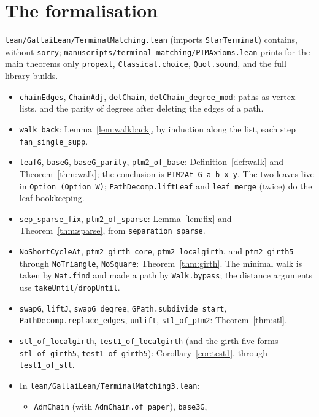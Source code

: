 \documentclass[11pt]{amsart}
\theoremstyle{definition}
\begin{document}
\section{The formalisation}\label{sec:lean}

\texttt{lean/GallaiLean/TerminalMatching.lean} (imports \texttt{StarTerminal}) contains, without
\texttt{sorry}; \texttt{manuscripts/terminal-matching/PTMAxioms.lean} prints for the main
theorems only \texttt{propext}, \texttt{Classical.choice}, \texttt{Quot.sound}, and the full
library builds.
\begin{itemize}
\item \texttt{chainEdges}, \texttt{ChainAdj}, \texttt{delChain}, \texttt{delChain\_degree\_mod}:
paths as vertex lists, and the parity of degrees after deleting the edges of a path.
\item \texttt{walk\_back}: Lemma~\ref{lem:walkback}, by induction along the list, each step
\texttt{fan\_single\_supp}.
\item \texttt{leafG}, \texttt{baseG}, \texttt{baseG\_parity}, \texttt{ptm2\_of\_base}:
Definition~\ref{def:walk} and Theorem~\ref{thm:walk}; the conclusion is \texttt{PTM2At G a b x y}.
The two leaves live in \texttt{Option (Option W)}; \texttt{PathDecomp.liftLeaf} and
\texttt{leaf\_merge} (twice) do the leaf bookkeeping.
\item \texttt{sep\_sparse\_fix}, \texttt{ptm2\_of\_sparse}: Lemma~\ref{lem:fix} and
Theorem~\ref{thm:sparse}, from \texttt{separation\_sparse}.
\item \texttt{NoShortCycleAt}, \texttt{ptm2\_girth\_core}, \texttt{ptm2\_localgirth}, and
\texttt{ptm2\_girth5} through \texttt{NoTriangle}, \texttt{NoSquare}: Theorem~\ref{thm:girth}. The minimal walk is taken by \texttt{Nat.find} and made a path by
\texttt{Walk.bypass}; the distance arguments use \texttt{takeUntil}/\texttt{dropUntil}.
\item \texttt{swapG}, \texttt{liftJ}, \texttt{swapG\_degree}, \texttt{GPath.subdivide\_start},
\texttt{PathDecomp.replace\_edges}, \texttt{unlift}, \texttt{stl\_of\_ptm2}: Theorem~\ref{thm:stl}.
\item \texttt{stl\_of\_localgirth}, \texttt{test1\_of\_localgirth} (and the girth-five forms
\texttt{stl\_of\_girth5}, \texttt{test1\_of\_girth5}): Corollary~\ref{cor:test1}, through
\texttt{test1\_of\_stl}.
\item In \texttt{lean/GallaiLean/TerminalMatching3.lean}:
  \begin{itemize}
  \item \texttt{AdmChain} (with \texttt{AdmChain.of\_paper}), \texttt{base3G},

\end{itemize}
\end{itemize}
\end{document}
